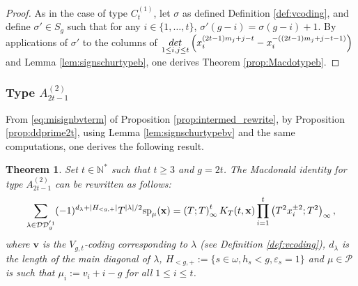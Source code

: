 \documentclass[11pt,letterpaper]{amsart}
\def\bbbz{\mathbb Z}
\def\ccdd{\mathcal {DD}}
\def\ccp{\mathcal P}
\DeclareMathOperator{\core}{core}
\DeclareMathOperator{\quot}{quot}
\def\det{{\rm det}}
\newtheorem{thm}[df]{Theorem}
\renewcommand{\sp}{\mathrm{sp}}
\numberwithin{equation}{section}
\numberwithin{df}{section}
\begin{document}
\begin{proof}
%
%
As in the case of type $C_t^{(1)}$, let $\sigma$ as defined Definition \ref{def:vcoding}, and define $\sigma'\in S_g$ such that for any $i\in\lbrace 1,\dots,t\rbrace$, $\sigma'(g-i)=\sigma(g-i)+1$. By applications of $\sigma'$ to the columns of $\underset{1\le i,j\le t}{\det}\left(x_i^{(2t-1)m_j+j-t}-x_i^{-((2t-1)m_j+j-t-1)}\right)$ and Lemma \ref{lem:signschurtypeb}, one derives Theorem \ref{prop:Macdotypeb}.
\end{proof}

\subsubsection{Type $A^{(2)}_{2t-1}$}

From \eqref{eq:misignbvterm} of Proposition \ref{prop:intermed_rewrite}, by Proposition \ref{prop:ddprime2t}, using Lemma \ref{lem:signschurtypebv} and the same computations, one derives the following result.
\begin{thm}\label{prop:Macdotypebv}
Set $t\in\mathbb{N}^*$ such that $t\geq 3$ and $g=2t$. The Macdonald identity for type $A^{(2)}_{2t-1}$ can be rewritten as follows:
\begin{equation}\label{eq:macdobv}
\sum_{\lambda\in\ccdd_{g}^{'1}} (-1)^{d_{\lambda}+\lvert H_{<g,+}\rvert}T^{\lvert\lambda\rvert/2}\sp_{\mu}({\bf x})=\left(T;T\right)_\infty^{t} K_T(t,\mathbf{x})\prod_{i=1}^t \left(T^2x_i^{\pm 2};T^2\right)_\infty,
\end{equation}
where $\mathbf{v}$ is the $V_{g,t}$-coding corresponding to $\lambda$ (see Definition \ref{def:vcoding}), $d_\lambda$ is the length of the main diagonal of $\lambda$, $H_{<g,+}:=\lbrace s\in\omega, h_s<g, \varepsilon_s=1\rbrace$ and $\mu\in\ccp$ is such that
$\mu_i:=v_i+i-g$ for all $1\leq i \leq t$.
\end{thm}
\end{document}
